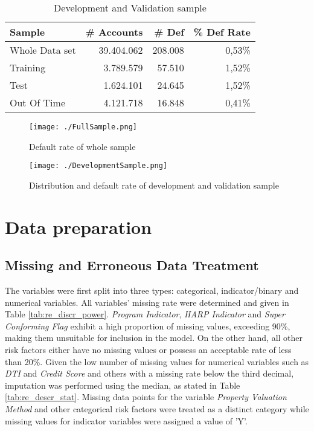 \begin{table}[H]
\centering
\begin{tabular}{lrrr} \toprule       
\textbf{Sample} & \textbf{\# Accounts} & \textbf{\# Def} & \textbf{\% Def Rate} \\\midrule
Whole Data set   & 39.404.062           & 208.008         & 0,53\%               \\
Training        & 3.789.579            & 57.510          & 1,52\%               \\
Test            & 1.624.101            & 24.645          & 1,52\%               \\
Out Of Time     & 4.121.718            & 16.848          & 0,41\%               \\\bottomrule
\end{tabular}
\caption{Development and Validation sample}
\label{tab:re_devoofsample}
\end{table}

\begin{figure}[H]
	\centering
	\texttt{[image: ./FullSample.png]}
    \caption{Default rate of whole sample}
    \label{fig:re_wholesample}
\end{figure}
\begin{figure}[H]
	\centering
	\texttt{[image: ./DevelopmentSample.png]}
    \caption{Distribution and default rate of development and validation sample}
    \label{fig:re_devsample}
\end{figure}

\section{Data preparation}
\subsection{Missing and Erroneous Data Treatment}
The variables were first split into three types: categorical, indicator/binary and numerical variables. All variables' missing rate were determined and given in Table \ref{tab:re_discr_power}. \emph{Program Indicator}, \emph{HARP Indicator} and \emph{Super Conforming Flag} exhibit a high proportion of missing values, exceeding 90\%, making them unsuitable for inclusion in the model. On the other hand, all other risk factors either have no missing values or possess an acceptable rate of less than 20\%. Given the low number of missing values for numerical variables such as \emph{DTI} and \emph{Credit Score} and others with a missing rate below the third decimal, imputation was performed using the median, as stated in Table \ref{tab:re_descr_stat}. Missing data points for the variable \emph{Property Valuation Method} and other categorical risk factors were treated as a distinct category while missing values for indicator variables were assigned a value of 'Y'.

